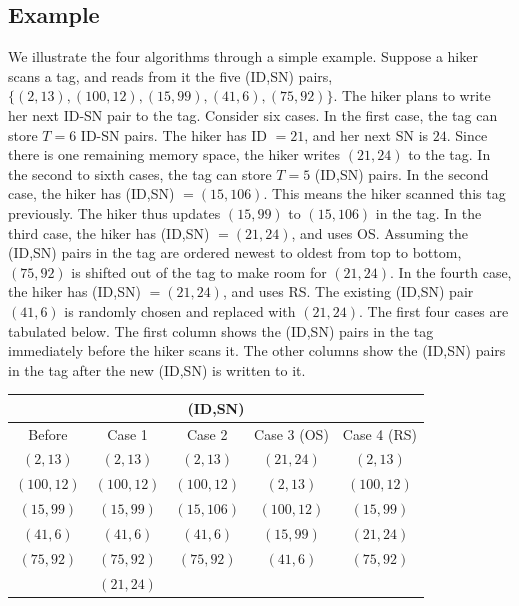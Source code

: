 \documentclass[conference]{IEEEtran}
\begin{document}
\subsection{Example}
We illustrate the four algorithms through a simple example.  Suppose a hiker scans a tag, and reads from it the five (ID,SN) pairs, $\{(2,13), (100,12), (15,99), (41,6), (75,92)\}$.  The hiker plans to write her next ID-SN pair to the tag.  Consider six cases.  In the first case, the tag can store $T = 6$ ID-SN pairs. The hiker has ID $=21$, and her next SN is $24$.  Since there is one remaining memory space, the hiker writes $(21,24)$ to the tag.  In the second to sixth cases, the tag can store $T = 5$ (ID,SN) pairs.  In the second case, the hiker has (ID,SN) $= (15,106)$.  This means the hiker scanned this tag previously.  The hiker thus updates $(15,99)$ to $(15,106)$ in the tag.  In the third case, the hiker has (ID,SN) $= (21,24)$, and uses OS.  Assuming the (ID,SN) pairs in the tag are ordered newest to oldest from top to bottom, $(75,92)$ is shifted out of the tag to make room for $(21,24)$.  In the fourth case, the hiker has (ID,SN) $=(21,24)$, and uses RS.  The existing (ID,SN) pair $(41,6)$ is randomly chosen and replaced with $(21,24)$.  The first four cases are tabulated below.  The first column shows the (ID,SN) pairs in the tag immediately before the hiker scans it.  The other columns show the (ID,SN) pairs in the tag after the new (ID,SN) is written to it.
\begin{footnotesize}
\begin{center}
\begin{tabular}{|c|c|c|c|c|}
\hline
\multicolumn{5}{|c|}{(ID,SN)} \\
\hline
Before & Case 1 & Case 2 & Case 3 (OS) & Case 4 (RS) \\
\hline
$(2,13)$     & $(2,13)$      & $(2,13)$     & $(21,24)$   & $(2,13)$  \\
$(100,12)$ & $(100,12)$  & $(100,12)$ & $(2,13)$     & $(100,12)$  \\
$(15,99)$   & $(15,99)$    & $(15,106)$   & $(100,12)$ & $(15,99)$ \\
$(41,6)$     & $(41,6)$      & $(41,6)$     & $(15,99)$   & $(21,24)$ \\
$(75,92)$   & $(75,92)$    & $(75,92)$   & $(41,6)$     & $(75,92)$ \\
            & $(21,24)$    &             &             & \\
\hline
\end{tabular}
\end{center}
\end{footnotesize}
\end{document}
